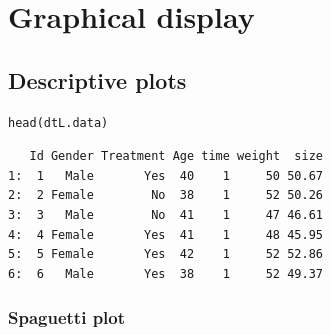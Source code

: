 \documentclass{article}
\begin{document}
\section{Graphical display}
\label{sec:org986edc7}
\subsection{Descriptive plots}
\label{sec:org870ad07}

\lstset{language=r,label= ,caption= ,captionpos=b,numbers=none}
\begin{lstlisting}
head(dtL.data)
\end{lstlisting}

\begin{verbatim}
   Id Gender Treatment Age time weight  size
1:  1   Male       Yes  40    1     50 50.67
2:  2 Female        No  38    1     52 50.26
3:  3   Male        No  41    1     47 46.61
4:  4 Female       Yes  41    1     48 45.95
5:  5 Female       Yes  42    1     52 52.86
6:  6   Male       Yes  38    1     52 49.37
\end{verbatim}

\subsubsection{Spaguetti plot}
\label{sec:orgbbc0495}
\end{document}
